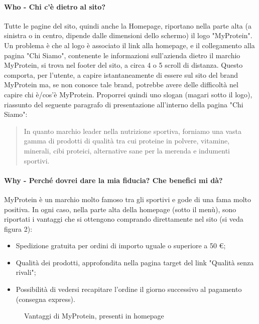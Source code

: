 \paragraph{Who - Chi c'è dietro al sito?}
Tutte le pagine del sito, quindi anche la Homepage, riportano nella parte alta (a sinistra o in centro, dipende dalle dimensioni dello schermo) il logo "MyProtein". Un problema è che al logo è associato il link alla homepage, e il collegamento alla pagina "Chi Siamo", contenente le informazioni sull'azienda dietro il marchio MyProtein, si trova nel footer del sito, a circa 4 o 5 scroll di distanza. Questo comporta, per l'utente, a capire istantaneamente di essere sul sito del brand MyProtein ma, se non conosce tale brand, potrebbe avere delle difficoltà nel capire chi è/cos'è MyProtein. Proporrei quindi uno slogan (magari sotto il logo), riassunto del seguente paragrafo di presentazione all'interno della pagina "Chi Siamo":
\begin{quote}
In quanto marchio leader nella nutrizione sportiva, forniamo una vasta gamma di prodotti di qualità tra cui proteine in polvere, vitamine, minerali, cibi proteici, alternative sane per la merenda e indumenti sportivi.
\end{quote}

\paragraph{Why - Perché dovrei dare la mia fiducia? Che benefici mi dà?}
MyProtein è un marchio molto famoso tra gli sportivi e gode di una fama molto positiva. In ogni caso, nella parte alta della homepage (sotto il menù), sono riportati i vantaggi che si ottengono comprando direttamente nel sito (si veda figura 2):
\begin{itemize}
	\item Spedizione gratuita per ordini di importo uguale o superiore a 50 \euro;
	\item Qualità dei prodotti, approfondita nella pagina target del link "Qualità senza rivali";
	\item Possibilità di vedersi recapitare l'ordine il giorno successivo al pagamento (consegna express).
\end{itemize}
\begin{figure}[!htb]
	\caption{\label{fig:figura2} Vantaggi di MyProtein, presenti in homepage}
\end{figure}
